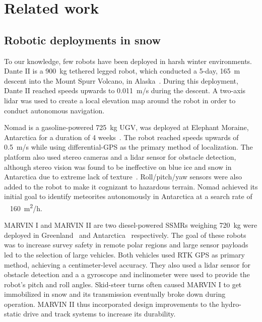 \section{Related work}
\label{sec:rel_work}

\subsection{Robotic deployments in snow}
\label{sec:snow_robots}

To our knowledge, few robots have been deployed in harsh winter environments. 
Dante II is a \SI{900}{kg} tethered legged robot, which conducted a 5-day, \SI{165}{m} descent into the Mount Spurr Volcano, in Alaska~\citep{Bares1999}.
During this deployment, Dante II reached speeds upwards to \SI{0.011}{m/s} during the descent.
A two-axis lidar was used to create a local elevation map around the robot in order to conduct autonomous navigation.

Nomad is a gasoline-powered \SI{725}{kg} \ac{UGV}, was deployed at Elephant Moraine, Antarctica for a duration of 4 weeks~\citep{Apostolopoulos2000}. 
The robot reached speeds upwards of \SI{0.5}{m/s} while using differential-\ac{GPS} as the primary method of localization.
The platform also used stereo cameras and a lidar sensor for obstacle detection, although stereo vision was found to be ineffective  on blue ice and snow in Antarctica due to extreme lack of texture~\citep{Moorehead1999}.
Roll/pitch/yaw sensors were also added to the robot to make it cognizant to hazardous terrain.
Nomad achieved its initial goal to identify meteorites autonomously in Antarctica at a search rate of ~  \SI{160}{m^2/h}.

MARVIN I and MARVIN II are two diesel-powered \acp{SSMR} weighing \SI{720}{kg} were deployed in Greenland~\citep{Stansbury2004} and Antarctica~\citep{Gifford2009} respectively. 
The goal of these robots was to increase survey safety in remote polar regions and large sensor payloads led to the selection of large vehicles.
Both vehicles used \ac{RTK} \ac{GPS} as primary method, achieving a centimeter-level accuracy.
They also used a lidar sensor for obstacle detection and a a gyroscope and inclinometer were used to provide the robot's pitch and roll angles.
Skid-steer turns often caused MARVIN I to get immobilized in snow and its transmission eventually broke down during operation.
MARVIN II thus incorporated design improvements to the hydro-static drive and track systems to increase its durability.


